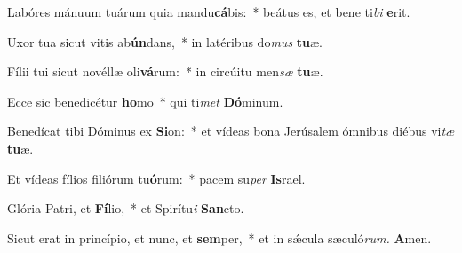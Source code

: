 \item Labóres mánuum tuárum quia mandu\textbf{cá}bis:~* beátus es, et bene ti\textit{bi} \textbf{e}rit.
\item Uxor tua sicut vitis ab\textbf{ún}dans,~* in latéribus do\textit{mus} \textbf{tu}æ.
\item Fílii tui sicut novéllæ oli\textbf{vá}rum:~* in circúitu men\tinyhspace\textit{sæ} \textbf{tu}æ.
\item Ecce sic benedicétur \textbf{ho}mo~* qui ti\textit{met} \textbf{Dó}minum.
\item Benedícat tibi Dóminus ex \textbf{Si}on:~* et vídeas bona Jerúsalem ómnibus diébus vi\textit{tæ} \textbf{tu}æ.
\item Et vídeas fílios filiórum tu\textbf{ó}rum:~* pacem su\textit{per} \textbf{Is}rael.
\item Glória Patri, et \textbf{Fí}lio,~* et Spirítu\tinyhspace\textit{i} \textbf{San}cto.
\item Sicut erat in princípio, et nunc, et \textbf{sem}per,~* et in sǽcula sæculó\textit{rum.} \textbf{A}men.
